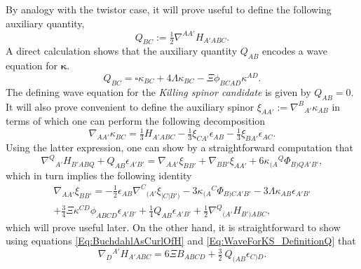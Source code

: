 \documentclass[10pt,a4paper]{article}
\theoremstyle{plain}
\begin{document}
By analogy with the twistor case, it will prove useful to define the
following auxiliary quantity,
\begin{equation}
  Q_{BC} := \tfrac{1}{2}\nabla^{AA'}H_{A'ABC}.
 \label{Eq:WaveForKS_DefinitionQ}
\end{equation}
A direct calculation shows that the auxiliary quantity $Q_{AB}$
encodes a wave equation for $\bm\kappa$.
\begin{equation}
  Q_{BC} = \square \kappa_{BC} + 4 \Lambda\kappa_{BC} - \Xi
  \phi_{BCAD}\kappa^{AD}.
  \label{Eq:WaveForKS}
\end{equation}
The defining wave equation for the \emph{Killing spinor candidate} is
given by $Q_{AB}=0$. It will also prove convenient to define the
auxiliary spinor $\xi_{AA'} := \nabla^{B}{}_{A'}\kappa_{AB}$ in terms
of which one can perform the following decomposition
\begin{equation}
\nabla_{AA'}\kappa_{BC} = \tfrac{1}{3} H_{A'ABC} - \tfrac{1}{3}
\xi_{CA'} \epsilon_{AB} - \tfrac{1}{3} \xi_{BA'}
\epsilon_{AC}.\label{Eq:DecompGradKS}
\end{equation}
Using the latter expression, one can show by a straightforward
computation that
\begin{equation}\label{eq:non-KillingVectorExplained}
  \nabla^Q{}_{A'}H_{B'ABQ} + Q_{AB} \epsilon_{A'B'} =
  \nabla_{AA'}\xi_{BB'} + \nabla_{BB'}\xi_{AA'} + 6 \kappa_{(A}{}^{Q}
  \Phi_{B)QA'B'},
\end{equation}
which in turn implies the following identity
\begin{multline}
\nabla_{AA'}\xi_{BB'} = - \tfrac{1}{2} \epsilon_{AB}
\nabla^{C}{}_{(A'}\xi_{|C|B')}- 3 \kappa_{(A}{}^{C} \Phi_{B)CA'B'} - 3
\Lambda \kappa_{AB} \epsilon_{A'B'} \\+ \tfrac{3}{4} \Xi \kappa^{CD}
\phi_{ABCD} \epsilon_{A'B'} + \tfrac{1}{4} Q_{AB} \epsilon_{A'B'} +
\tfrac{1}{2} \nabla^Q{}_{(A'}H_{B')ABC},\label{Eq:DecompGradXi}
\end{multline}
which will prove useful later. On the other hand, it is
straightforward to show using equations \eqref{Eq:BuchdahlAsCurlOfH}
and \eqref{Eq:WaveForKS_DefinitionQ} that
\begin{equation}
     \nabla_{D}{}^{A'}H_{A'ABC} = 6 \Xi B_{ABCD} + \tfrac{3}{2}
     \ Q_{(AB}\epsilon_{C)D}.\label{IrrDecompCurlOfH}
\end{equation}
\end{document}
